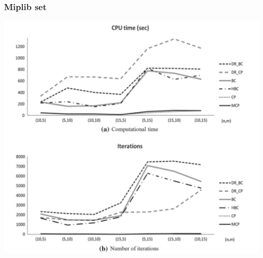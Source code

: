 \documentclass[11pt]{beamer}
\begin{document}
\begin{frame}
	\frametitle{Miplib set}
\centering
\includegraphics[height=0.8\textheight]{run-times.pdf}
\end{frame}
\end{document}
